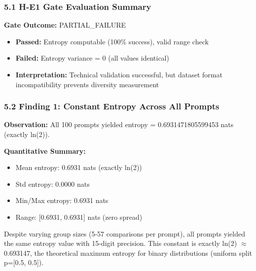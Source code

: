 
\subsubsection{5.1 H-E1 Gate Evaluation Summary}

\begin{table}[htbp]
\centering
{}
\end{table}

\textbf{Gate Outcome:} PARTIAL\_FAILURE
\begin{itemize}
\item \textbf{Passed:} Entropy computable (100\% success), valid range check
\item \textbf{Failed:} Entropy variance = 0 (all values identical)
\item \textbf{Interpretation:} Technical validation successful, but dataset format incompatibility prevents diversity measurement
\end{itemize}

\subsubsection{5.2 Finding 1: Constant Entropy Across All Prompts}

\textbf{Observation:} All 100 prompts yielded entropy = 0.6931471805599453 nats (exactly ln(2)).

\textbf{Quantitative Summary:}
\begin{itemize}
\item Mean entropy: 0.6931 nats (exactly ln(2))
\item Std entropy: 0.0000 nats
\item Min/Max entropy: 0.6931 nats
\item Range: [0.6931, 0.6931] nats (zero spread)
\end{itemize}

Despite varying group sizes (5-57 comparisons per prompt), all prompts yielded the same entropy value with 15-digit precision. This constant is exactly ln(2) $\approx$ 0.693147, the theoretical maximum entropy for binary distributions (uniform split p=[0.5, 0.5]).

